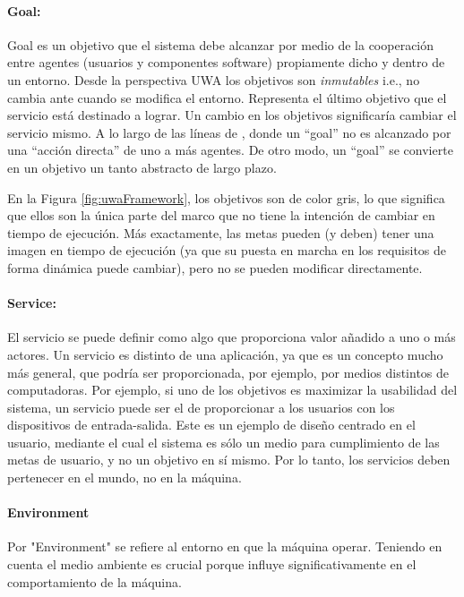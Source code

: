 \paragraph{Goal:}

Goal es un objetivo que el sistema debe alcanzar por medio de la cooperación entre agentes (usuarios y componentes  software) propiamente dicho y dentro de un entorno. Desde la perspectiva UWA los objetivos son \textit{inmutables} i.e., no cambia ante cuando se modifica el entorno. Representa el último objetivo que el servicio está destinado a lograr. Un cambio en los objetivos significaría cambiar el servicio mismo. A lo largo de las líneas de \cite{UWA5}, donde un “goal” no es alcanzado por una “acción directa” de uno a más agentes. De otro modo, un “goal” se convierte en un objetivo un tanto
abstracto de largo plazo.

En la Figura \ref{fig:uwaFramework}, los objetivos son de color gris, lo que significa que ellos son la única parte del marco que no tiene la intención de cambiar en tiempo de ejecución. Más exactamente, las metas pueden (y deben) tener una imagen en tiempo de ejecución (ya que su puesta en marcha en los requisitos de forma dinámica puede cambiar), pero no se pueden modificar directamente.

\paragraph{Service:}

El servicio se puede definir como algo que proporciona valor añadido a uno o más actores. Un servicio es distinto de
una aplicación, ya que es un concepto mucho más general, que podría ser proporcionada, por ejemplo, por medios distintos de
computadoras. Por ejemplo, si uno de los objetivos es maximizar la usabilidad del sistema, un servicio puede ser el de proporcionar a los usuarios con los dispositivos de entrada-salida. Este es un ejemplo de diseño centrado en el
usuario, mediante el cual el sistema es sólo un medio para cumplimiento de las metas de usuario, y no un objetivo en sí mismo. Por lo tanto, los servicios deben pertenecer en el mundo, no en la máquina.


\paragraph{Environment}

Por "Environment" se refiere al entorno en que la máquina operar. Teniendo en cuenta el medio ambiente es crucial porque influye significativamente en el comportamiento de la máquina.

